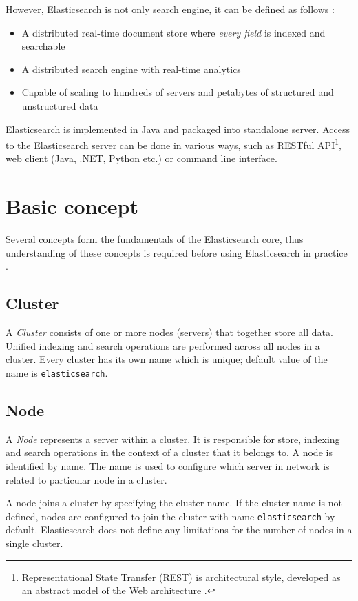 \documentclass[12pt,oneside]{fithesis2}
\begin{document}
However, Elasticsearch is not only search engine, it can be defined as follows \cite{elasticsearch_defnitive_guide}:

\begin{itemize}
	\item A distributed real-time document store where \textit{every field} is indexed and searchable
	\item A distributed search engine with real-time analytics
	\item Capable of scaling to hundreds of servers and petabytes of structured and unstructured data
\end{itemize}

Elasticsearch is implemented in Java and packaged into standalone server. Access to the Elasticsearch server can be done in various ways, such as RESTful API\footnote{Representational State Transfer (REST) is architectural style, developed as an abstract model of the Web architecture \cite{rest}.}, web client (Java, .NET, Python etc.) or command line interface.


\section{Basic concept}
Several concepts form the fundamentals of the Elasticsearch core, thus understanding of these concepts is required before using Elasticsearch in practice \cite{elasticsearch_doc}.

\subsection{Cluster}
A \textit{Cluster} consists of one or more nodes (servers) that together store all data. Unified indexing and search operations are performed across all nodes in a cluster. Every cluster has its own name which is unique; default value of the name is \verb|elasticsearch|.

\subsection{Node}
A \textit{Node} represents a server within a cluster. It is responsible for store, indexing and search operations in the context of a cluster that it belongs to. A node is identified by name. The name is used to configure which server in network is related to particular node in a cluster.

A node joins a cluster by specifying the cluster name. If the cluster name is not defined, nodes are configured to join the cluster with name \verb|elasticsearch| by default. Elasticsearch does not define any limitations for the number of nodes in a single cluster.
\end{document}
